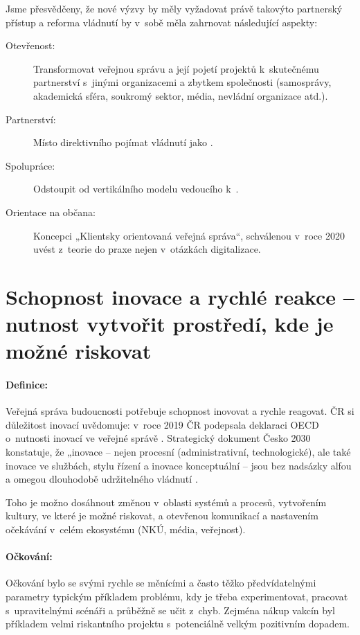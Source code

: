 Jsme přesvědčeny, že nové výzvy by měly vyžadovat právě takovýto partnerský přístup \cite{christopher_blueprint_2021} a reforma vládnutí by v~sobě měla zahrnovat následující aspekty:

\begin{description}
  \item[Otevřenost:] Transformovat veřejnou správu a její pojetí projektů k~skutečnému partnerství s~jinými organizacemi a zbytkem společnosti (samosprávy, akademická sféra, soukromý sektor, média, nevládní organizace atd.).
  \item[Partnerství:] Místo direktivního  pojímat vládnutí jako  \cite{department_of_the_prime_minister_and_cabinet_our_2019}.
  \item[Spolupráce:] Odstoupit od vertikálního modelu vedoucího k~.
  \item[Orientace na občana:] Koncepci „Klientsky orientovaná veřejná správa“, schvá\-le\-nou v~roce 2020 \cite{koncepce_verejna_sprava_2030} uvést z~teorie do praxe nejen v~otázkách digitalizace.
\end{description}

\section*{Schopnost inovace a rychlé reakce -- nutnost vytvořit prostředí, kde je možné riskovat}

\paragraph{Definice:} Veřejná správa budoucnosti potřebuje schopnost inovovat a rychle reagovat. ČR si důležitost inovací uvědomuje: v~roce 2019 ČR podepsala deklaraci OECD o~nutnosti inovací ve veřejné správě \cite{oecd_deklarace_2019}. Strategický dokument Česko 2030 konstatuje, že „inovace – nejen procesní (administrativní, technologické), ale také inovace ve službách, stylu řízení a inovace konceptuální – jsou bez nadsázky alfou a omegou dlouhodobě udržitelného vládnutí \cite{sr2030}.

Toho je možno dosáhnout změnou v~oblasti systémů a procesů, vytvořením kultury, ve které je možné riskovat, a otevřenou komunikací a nastavením očekávání v~celém ekosystému (NKÚ, média, veřejnost).

\paragraph{Očkování:} Očkování bylo se svými rychle se měnícími a často těžko před\-ví\-da\-tel\-ný\-mi parametry typickým pří\-kla\-dem problému, kdy je třeba experimentovat, pracovat s~upravitelnými scénáři a průběžně se učit z~chyb. Zejména nákup vakcín byl příkladem velmi riskantního projektu s~potenciálně velkým pozitivním dopadem.

